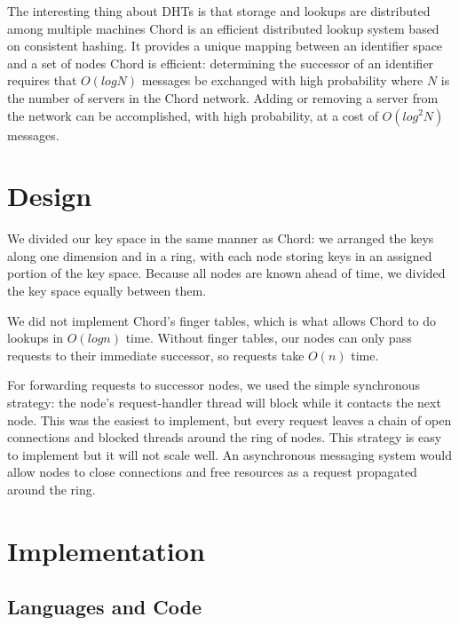 \documentclass[11pt,conference]{IEEEtran}
\begin{document}
\fi

The interesting thing about DHTs is that storage and lookups are distributed among multiple machines \cite{linuxjournal_dht}
Chord is an efficient distributed lookup system based on consistent hashing. It provides a
unique mapping between an identifier space and a set of nodes \cite{chord}
\newline
Chord is efficient: determining the successor of an identifier requires that $O(log N)$ messages be exchanged with high probability where $N$ is the number of servers in the
Chord network. Adding or removing a server from the network
can be accomplished, with high probability, at a cost of $O(log^2 N)$ messages.
\cite{chord}
\fi


\section{Design}

We divided our key space in the same manner as Chord\cite{chord}: we arranged
the keys along one dimension and in a ring, with each node storing keys in an
assigned portion of the key space. Because all nodes are known ahead of time, we
divided the key space equally between them.

We did not implement Chord's finger tables, which is what allows Chord to do
lookups in $O(log n)$ time. Without finger tables, our nodes can only pass
requests to their immediate successor, so requests take $O(n)$ time.

For forwarding requests to successor nodes, we used the simple synchronous
strategy: the node's request-handler thread will block while it contacts the
next node. This was the easiest to implement, but every request leaves a chain
of open connections and blocked threads around the ring of nodes. This strategy
is easy to implement but it will not scale well. An asynchronous messaging
system would allow nodes to close connections and free resources as a request
propagated around the ring.




\section{Implementation}


\subsection{Languages and Code}
\end{document}
